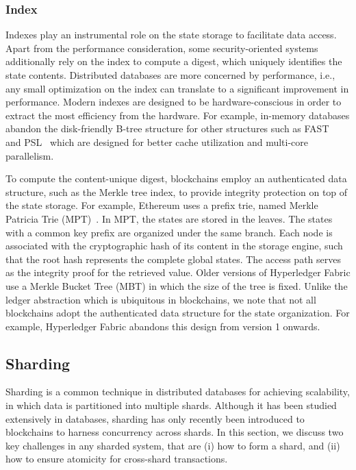 \subsubsection{Index}
Indexes play an instrumental role on the state storage to facilitate data
access.
Apart from the performance consideration, some security-oriented systems
additionally rely on the index to compute a digest, which uniquely identifies
the state contents.
Distributed databases are more concerned by performance, i.e., any small
optimization on the index can translate to a significant improvement in
performance. Modern indexes are designed to be hardware-conscious in order to
extract the most efficiency from the hardware. For example, in-memory databases
abandon the disk-friendly B-tree structure for other structures such as
FAST~\cite{kim2010fast} and PSL~\cite{xie2017parallelizing} which are designed
for better cache utilization and multi-core parallelism.

To compute the content-unique digest, blockchains employ an authenticated data
structure, such as the Merkle tree index, to provide integrity protection on top
of the state storage.
For example, Ethereum uses a prefix trie, named Merkle Patricia Trie
(MPT)~\cite{web:mpt}. In MPT, the states are stored in the leaves. The states
with a common key prefix are organized under the same branch. Each node is
associated with the cryptographic hash of its content in the storage engine,
such that the root hash represents the complete global states. The access path
serves as the integrity proof for the retrieved value. Older versions of
Hyperledger Fabric use a Merkle Bucket Tree (MBT) in which the size of the tree
is fixed.
Unlike the ledger abstraction which is ubiquitous in blockchains, we note that
not all blockchains adopt the authenticated data structure for the state
organization. For example, Hyperledger Fabric abandons this design from version
1 onwards.	


\subsection{Sharding}

Sharding is a common technique in distributed databases for achieving
scalability, in which data is partitioned into multiple shards. Although it has
been studied extensively in databases, sharding has only recently been
introduced to blockchains to harness concurrency across shards. In
this section, we discuss two key challenges in any sharded system, that are (i)
how to form a shard, and (ii) how to ensure atomicity for cross-shard
transactions.

